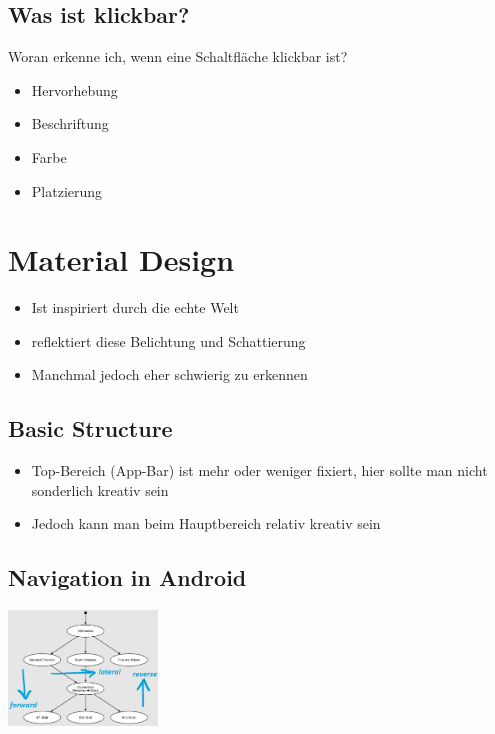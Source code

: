 \documentclass{report}
\newenvironment{Figure}
	{\par\medskip\noindent\minipage{\linewidth}}
	{\endminipage\par\medskip}
\theoremstyle{definition}
\theoremstyle{example}
\begin{document}
\subsection{Was ist klickbar?}
Woran erkenne ich, wenn eine Schaltfläche klickbar ist?
\begin{itemize}
   \item Hervorhebung
   \item Beschriftung
   \item Farbe
   \item Platzierung
\end{itemize}

\section{Material Design}
\begin{itemize}
   \item Ist inspiriert durch die echte Welt
   \item reflektiert diese Belichtung und Schattierung
   \item Manchmal jedoch eher schwierig zu erkennen
\end{itemize}

\subsection{Basic Structure}
\begin{itemize}
   \item Top-Bereich (App-Bar) ist mehr oder weniger fixiert, hier sollte man nicht sonderlich kreativ sein
   \item Jedoch kann man beim Hauptbereich relativ kreativ sein
\end{itemize}

\subsection{Navigation in Android}

\begin{Figure}
   \centering
    \includegraphics[width=150px]{img/Navigation.png}
        \label{fig:Navigation in Android}
\end{Figure}
\end{document}
